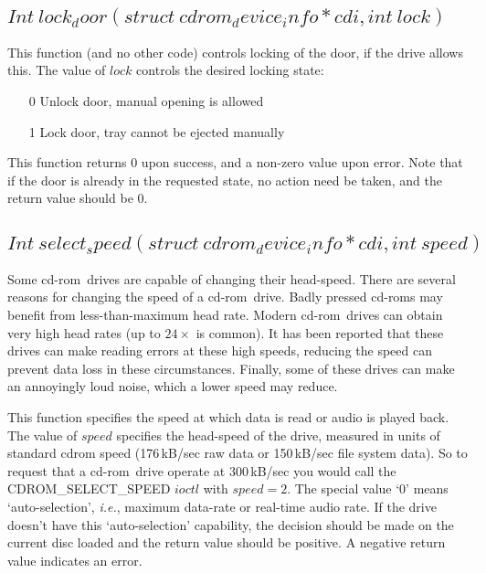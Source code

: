 \documentclass{article}
\def\cdrom{{\sc cd-rom}}
\def\fo{\sl}                    %
\def\ie{{\fo i.e.}}
\begin{document}
\subsection{$Int\ lock_door(struct\ cdrom_device_info * cdi, int\ lock)$}

This function (and no other code) controls locking of the door, if the
drive allows this. The value of $lock$ controls the desired locking
state:
\begin{itemize}
\item[0] Unlock door, manual opening is allowed
\item[1] Lock door, tray cannot be ejected manually
\end{itemize}
This function returns 0 upon success, and a non-zero value upon
error. Note that if the door is already in the requested state, no
action need be taken, and the return value should be 0. 

\subsection{$Int\ select_speed(struct\ cdrom_device_info * cdi, int\ speed)$}

Some \cdrom\ drives are capable of changing their head-speed. There
are several reasons for changing the speed of a \cdrom\ drive. Badly
pressed \cdrom s may benefit from less-than-maximum head rate. Modern
\cdrom\ drives can obtain very high head rates (up to $24\times$ is
common).  It has been reported that these drives can make reading
errors at these high speeds, reducing the speed can prevent data loss
in these circumstances.  Finally, some of these drives can
make an annoyingly loud noise, which a lower speed may reduce. %

This function specifies the speed at which data is read or audio is
played back. The value of $speed$ specifies the head-speed of the
drive, measured in units of standard cdrom speed (176\,kB/sec raw data
or 150\,kB/sec file system data). So to request that a \cdrom\ drive
operate at 300\,kB/sec you would call the CDROM_SELECT_SPEED $ioctl$
with $speed=2$. The special value `0' means `auto-selection', \ie,
maximum data-rate or real-time audio rate. If the drive doesn't have
this `auto-selection' capability, the decision should be made on the
current disc loaded and the return value should be positive. A negative
return value indicates an error.
\end{document}

